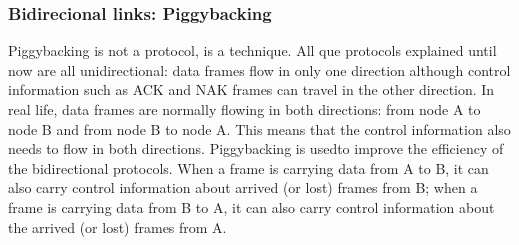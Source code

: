 \subsubsection{Bidirecional links: Piggybacking}
Piggybacking is not a protocol, is a technique. All que protocols explained until now are all unidirectional: data frames flow
in only one direction although control information such as ACK and NAK frames can
travel in the other direction. In real life, data frames are normally flowing in both directions:
from node A to node B and from node B to node A. This means that the control
information also needs to flow in both directions. Piggybacking is usedto improve the efficiency of the bidirectional protocols. When a frame is carrying
data from A to B, it can also carry control information about arrived (or lost) frames
from B; when a frame is carrying data from B to A, it can also carry control information
about the arrived (or lost) frames from A.

